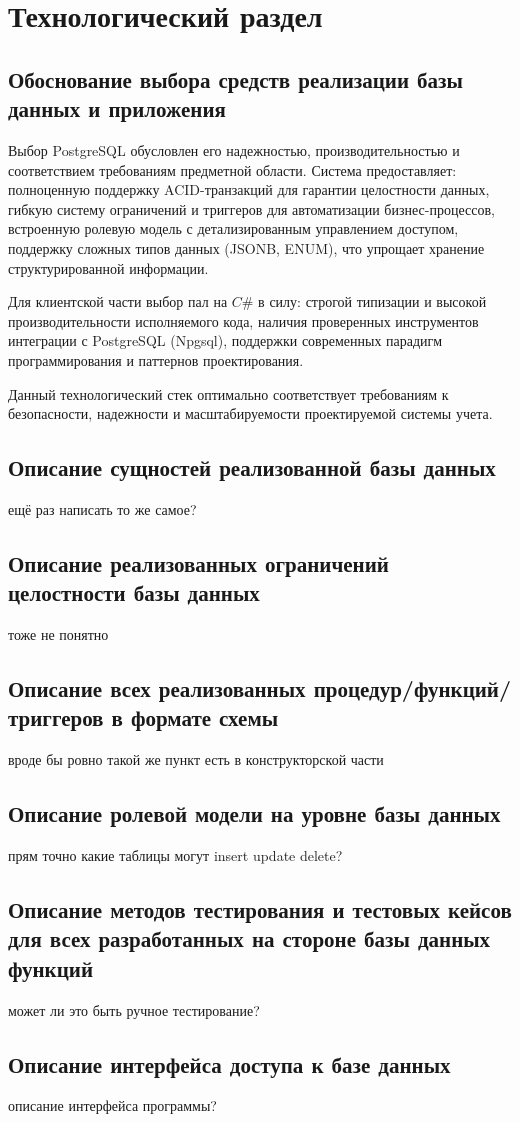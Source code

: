 \chapter{Технологический раздел}
\section{Обоснование выбора средств реализации базы данных и приложения}
Выбор PostgreSQL обусловлен его надежностью, производительностью и соответствием требованиям предметной области. Система предоставляет: полноценную поддержку ACID-транзакций для гарантии целостности данных, гибкую систему ограничений и триггеров для автоматизации бизнес-процессов, встроенную ролевую модель с детализированным управлением доступом, поддержку сложных типов данных (JSONB, ENUM), что упрощает хранение структурированной информации.

Для клиентской части выбор пал на $C\#$ в силу: строгой типизации и высокой производительности исполняемого кода, наличия проверенных инструментов интеграции с PostgreSQL (Npgsql), поддержки современных парадигм программирования и паттернов проектирования.

Данный технологический стек оптимально соответствует требованиям к безопасности, надежности и масштабируемости проектируемой системы учета.
\section{Описание сущностей реализованной базы данных}
ещё раз написать то же самое?
\section{Описание реализованных ограничений целостности базы данных}
тоже не понятно
\section{Описание всех реализованных процедур/функций/триггеров в формате схемы}
вроде бы ровно такой же пункт есть в конструкторской части
\section{Описание ролевой модели на уровне базы данных}
прям точно какие таблицы могут insert update delete?
\section{Описание методов тестирования и тестовых кейсов для всех разработанных на стороне базы данных функций}
может ли это быть ручное тестирование?
\section{Описание интерфейса доступа к базе данных}
описание интерфейса программы?
